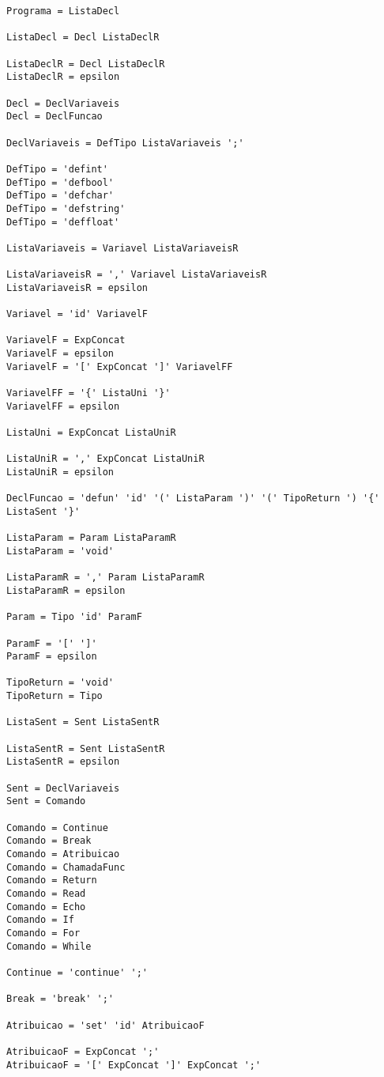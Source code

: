 \documentclass[
  12pt,				%
  oneside,			%
  a4paper,			%
  english,			%
  french,				%
  spanish,			%
  brazil,				%
]{abntex2}
\begin{document}
\begin{lstlisting}[label={code:gramatica-original},caption={Gramática
    original da linguagem de programação LisC.},style={mystyle}]
Programa = ListaDecl

ListaDecl = Decl ListaDeclR

ListaDeclR = Decl ListaDeclR
ListaDeclR = epsilon

Decl = DeclVariaveis
Decl = DeclFuncao

DeclVariaveis = DefTipo ListaVariaveis ';'

DefTipo = 'defint'
DefTipo = 'defbool'
DefTipo = 'defchar'
DefTipo = 'defstring'
DefTipo = 'deffloat'

ListaVariaveis = Variavel ListaVariaveisR

ListaVariaveisR = ',' Variavel ListaVariaveisR
ListaVariaveisR = epsilon

Variavel = 'id' VariavelF

VariavelF = ExpConcat
VariavelF = epsilon
VariavelF = '[' ExpConcat ']' VariavelFF

VariavelFF = '{' ListaUni '}'
VariavelFF = epsilon

ListaUni = ExpConcat ListaUniR

ListaUniR = ',' ExpConcat ListaUniR
ListaUniR = epsilon

DeclFuncao = 'defun' 'id' '(' ListaParam ')' '(' TipoReturn ') '{' ListaSent '}'

ListaParam = Param ListaParamR
ListaParam = 'void'

ListaParamR = ',' Param ListaParamR
ListaParamR = epsilon

Param = Tipo 'id' ParamF

ParamF = '[' ']'
ParamF = epsilon

TipoReturn = 'void'
TipoReturn = Tipo

ListaSent = Sent ListaSentR

ListaSentR = Sent ListaSentR
ListaSentR = epsilon

Sent = DeclVariaveis
Sent = Comando

Comando = Continue
Comando = Break
Comando = Atribuicao
Comando = ChamadaFunc
Comando = Return
Comando = Read
Comando = Echo
Comando = If
Comando = For
Comando = While

Continue = 'continue' ';'

Break = 'break' ';'

Atribuicao = 'set' 'id' AtribuicaoF

AtribuicaoF = ExpConcat ';'
AtribuicaoF = '[' ExpConcat ']' ExpConcat ';'


\end{lstlisting}
\end{document}
